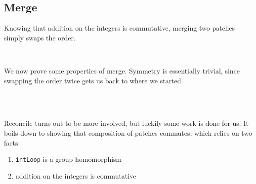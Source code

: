 \subsection{Merge}

Knowing that addition on the integers is commutative, merging two patches simply swaps
the order.
\begin{code}%
\>[0]\AgdaSpace{}%
\AgdaSymbol{:}\AgdaSpace{}%
\AgdaSymbol{(}\AgdaSpace{}%
\AgdaSpace{}%
\AgdaSymbol{)}\AgdaSpace{}%
\AgdaSpace{}%
\AgdaSymbol{(}\AgdaSpace{}%
\AgdaSpace{}%
\AgdaSymbol{)}\<%
\\
\>[0]\AgdaSpace{}%
\AgdaSymbol{(}\AgdaSpace{}%
\AgdaOperator{\AgdaInductiveConstructor{,}}\AgdaSpace{}%
\AgdaSymbol{)}\AgdaSpace{}%
\AgdaSymbol{=}\AgdaSpace{}%
\AgdaSymbol{(}\AgdaSpace{}%
\AgdaOperator{\AgdaInductiveConstructor{,}}\AgdaSpace{}%
\AgdaSymbol{)}\<%
\end{code}
We now prove some properties of merge. Symmetry is essentially trivial, since swapping
the order twice gets us back to where we started.
\begin{code}%
\>[0]\AgdaSpace{}%
\AgdaSymbol{:}%
\>[86I]\AgdaSymbol{\{}\AgdaSpace{}%
\AgdaSpace{}%
\AgdaSpace{}%
\AgdaSpace{}%
\AgdaSpace{}%
\AgdaSymbol{:}\AgdaSpace{}%
\AgdaSpace{}%
\AgdaSymbol{\}}\<%
\\
\>[.][@{}l@{}]\<[86I]%
\>[12]\AgdaSpace{}%
\AgdaSpace{}%
\AgdaSymbol{(}\AgdaSpace{}%
\AgdaSpace{}%
\AgdaOperator{\AgdaInductiveConstructor{,}}\AgdaSpace{}%
\AgdaSpace{}%
\AgdaSymbol{)}\AgdaSpace{}%
\AgdaSpace{}%
\AgdaSymbol{(}\AgdaSpace{}%
\AgdaSpace{}%
\AgdaOperator{\AgdaInductiveConstructor{,}}\AgdaSpace{}%
\AgdaSpace{}%
\AgdaSymbol{)}\AgdaSpace{}%
\AgdaSpace{}%
\AgdaSpace{}%
\AgdaSymbol{(}\AgdaSpace{}%
\AgdaSpace{}%
\AgdaOperator{\AgdaInductiveConstructor{,}}\AgdaSpace{}%
\AgdaSpace{}%
\AgdaSymbol{)}\AgdaSpace{}%
\AgdaSpace{}%
\AgdaSymbol{(}\AgdaSpace{}%
\AgdaSpace{}%
\AgdaOperator{\AgdaInductiveConstructor{,}}\AgdaSpace{}%
\AgdaSpace{}%
\AgdaSymbol{)}\<%
\\
\>[0]\AgdaSpace{}%
\AgdaSpace{}%
\AgdaSymbol{=}\AgdaSpace{}%
\AgdaSpace{}%
\AgdaSpace{}%
\<%
\end{code}
Reconcile turns out to be more involved, but luckily some work is done for us.
It boils down to showing that composition of patches commutes, which relies on two facts:
\begin{enumerate}
  \item \texttt{intLoop} is a group homomorphism
  \item addition on the integers is commutative
\end{enumerate}

